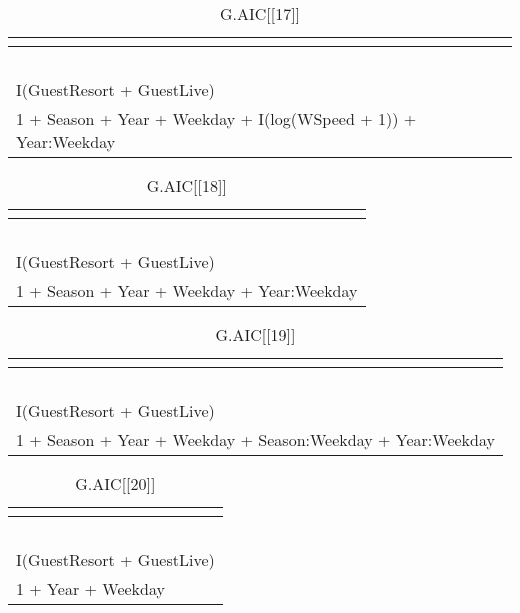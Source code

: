 %
\begin{table}[!tbp]
\caption{G.AIC[[17]]\label{G.AIC[[17]]}} 
\begin{center}
\begin{tabular}{l}
\hline\hline
\multicolumn{1}{c}{}\tabularnewline
\hline
~\tabularnewline
I(GuestResort + GuestLive)\tabularnewline
1 + Season + Year + Weekday + I(log(WSpeed + 1)) + Year:Weekday\tabularnewline
\hline
\end{tabular}
\end{center}
\end{table}

%
\begin{table}[!tbp]
\caption{G.AIC[[18]]\label{G.AIC[[18]]}} 
\begin{center}
\begin{tabular}{l}
\hline\hline
\multicolumn{1}{c}{}\tabularnewline
\hline
~\tabularnewline
I(GuestResort + GuestLive)\tabularnewline
1 + Season + Year + Weekday + Year:Weekday\tabularnewline
\hline
\end{tabular}
\end{center}
\end{table}

%
\begin{table}[!tbp]
\caption{G.AIC[[19]]\label{G.AIC[[19]]}} 
\begin{center}
\begin{tabular}{l}
\hline\hline
\multicolumn{1}{c}{}\tabularnewline
\hline
~\tabularnewline
I(GuestResort + GuestLive)\tabularnewline
1 + Season + Year + Weekday + Season:Weekday + Year:Weekday\tabularnewline
\hline
\end{tabular}
\end{center}
\end{table}

%
\begin{table}[!tbp]
\caption{G.AIC[[20]]\label{G.AIC[[20]]}} 
\begin{center}
\begin{tabular}{l}
\hline\hline
\multicolumn{1}{c}{}\tabularnewline
\hline
~\tabularnewline
I(GuestResort + GuestLive)\tabularnewline
1 + Year + Weekday\tabularnewline
\hline
\end{tabular}
\end{center}
\end{table}

